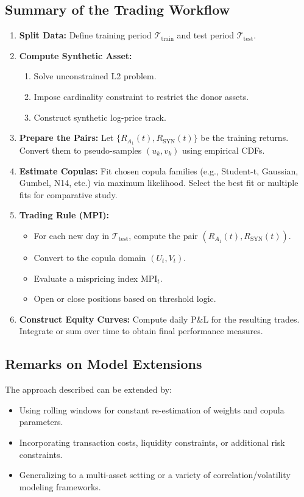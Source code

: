 \subsection*{Summary of the Trading Workflow}
\begin{enumerate}
\item \textbf{Split Data:} Define training period \(\mathcal{T}_{\text{train}}\) and test period \(\mathcal{T}_{\text{test}}\).  
\item \textbf{Compute Synthetic Asset:}  
\begin{enumerate}
    \item Solve unconstrained L2 problem.  
    \item Impose cardinality constraint to restrict the donor assets.  
    \item Construct synthetic log-price track.  
\end{enumerate}
\item \textbf{Prepare the Pairs:} Let \(\{R_{A_1}(t), R_{\text{SYN}}(t)\}\) be the training returns. Convert them to pseudo-samples \((u_k,v_k)\) using empirical CDFs.  
\item \textbf{Estimate Copulas:} Fit chosen copula families (e.g., Student-t, Gaussian, Gumbel, N14, etc.) via maximum likelihood. Select the best fit or multiple fits for comparative study.  
\item \textbf{Trading Rule (MPI):} 
\begin{itemize}
    \item For each new day in \(\mathcal{T}_{\text{test}}\), compute the pair \((R_{A_1}(t), R_{\text{SYN}}(t))\).  
    \item Convert to the copula domain \((U_t, V_t)\).  
    \item Evaluate a mispricing index \(\text{MPI}_t\).  
    \item Open or close positions based on threshold logic.  
\end{itemize}
\item \textbf{Construct Equity Curves:} Compute daily P\&L for the resulting trades. Integrate or sum over time to obtain final performance measures.
\end{enumerate}

\subsection*{Remarks on Model Extensions}
The approach described can be extended by:
\begin{itemize}
\item Using rolling windows for constant re-estimation of weights and copula parameters.
\item Incorporating transaction costs, liquidity constraints, or additional risk constraints.
\item Generalizing to a multi-asset setting or a variety of correlation/volatility modeling frameworks.
\end{itemize}

